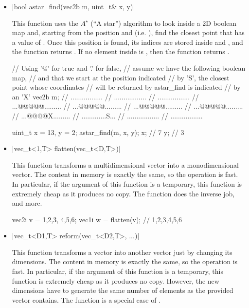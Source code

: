 \documentclass[12pt]{report}
\newenvironment{example}
{
    \begin{mdframed}[style=example,frametitle={Example}]
}
{
    \end{mdframed}
}
\begin{document}
\begin{itemize}
\item \cppinline|bool astar_find(vec2b m, uint_t& x, y)| 

This function uses the $A^\star$ (``A star'') algorithm to look inside a 2D boolean map  and, starting from the position  and  (i.e. ), find the closest point that has a value of . Once this position is found, its indices are stored inside  and , and the function returns . If no element inside  is , then the function returns .

\begin{example}
\begin{cppcode}
// Using '@' for true and '.' for false,
// assume we have the following boolean map,
// and that we start at the position indicated
// by 'S', the closest point whose coordinates
// will be returned by astar_find is indicated
// by an 'X'
vec2b m;
// .................
// .................
// .................
// ...@@@@@.........
// ...@@@@@.........
// ...@@@@@.........
// ...@@@@@.........
// ...@@@@X.........
// .............S...
// .................
// .................

uint_t x = 13, y = 2;
astar_find(m, x, y);
x; // 7
y; // 3
\end{cppcode}
\end{example}

\item \cppinline|vec_t<1,T> flatten(vec_t<D,T>)| 

This function transforms a multidimensional vector into a monodimensional vector. The content in memory is exactly the same, so the operation is fast. In particular, if the argument of this function is a temporary, this function is extremely cheap as it produces no copy. The  function does the inverse job, and more.

\begin{example}
\begin{cppcode}
vec2i v = {{1,2,3}, {4,5,6}};
vec1i w = flatten(v); // {1,2,3,4,5,6}
\end{cppcode}
\end{example}

\item \cppinline|vec_t<D1,T> reform(vec_t<D2,T>, ...)| 

This function transforms a vector into another vector just by changing its dimensions. The content in memory is exactly the same, so the operation is fast. In particular, if the argument of this function is a temporary, this function is extremely cheap as it produces no copy. However, the new dimensions have to generate the same number of elements as the provided vector contains. The  function is a special case of .


\end{itemize}
\end{document}
